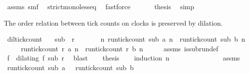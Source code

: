 \begin{isabellebody}
\ assms{\isacharparenleft}{}{\isacharparenright}\ smf\ \isamarkupfalse%
\ strict{\isacharunderscore}mono{\isacharunderscore}less{\isacharunderscore}eq\ \isamarkupfalse%
\ fastforce\isanewline
\ \ \isamarkupfalse%
\ {\isacharasterisk}{\isacharasterisk}\ \isamarkupfalse%
\ {\isacharquery}thesis\ \isamarkupfalse%
\ simp\isanewline
{}\isamarkupfalse%
%
\endisatagproof
{\isafoldproof}%
%
\isadelimproof
%
\endisadelimproof
%
\begin{isamarkuptext}%
The order relation between tick counts on clocks is preserved by dilation.%
\end{isamarkuptext}\isamarkuptrue%
\isamarkupfalse%
\ dil{\isacharunderscore}tick{\isacharunderscore}count{\isacharcolon}\isanewline
\ \ \ {\isacartoucheopen}sub\ {\isasymlless}\ r{\isacartoucheclose}\isanewline
\ \ \ \ \ \ \ {\isacartoucheopen}{\isasymforall}n{\isachardot}\ run{\isacharunderscore}tick{\isacharunderscore}count\ sub\ a\ n\ {\isasymle}\ run{\isacharunderscore}tick{\isacharunderscore}count\ sub\ b\ n{\isacartoucheclose}\isanewline
\ \ \ \ \ {\isacartoucheopen}run{\isacharunderscore}tick{\isacharunderscore}count\ r\ a\ n\ {\isasymle}\ run{\isacharunderscore}tick{\isacharunderscore}count\ r\ b\ n{\isacartoucheclose}\isanewline
%
\isadelimproof
%
\endisadelimproof
%
\isatagproof
{}\isamarkupfalse%
\ {\isacharminus}\isanewline
\ \ \isamarkupfalse%
\ assms{\isacharparenleft}{}{\isacharparenright}\ is{\isacharunderscore}subrun{\isacharunderscore}def\ \isamarkupfalse%
\ f\ \ {\isacharasterisk}{\isacharcolon}{\isacartoucheopen}dilating\ f\ sub\ r{\isacartoucheclose}\ \isamarkupfalse%
\ blast\isanewline
\ \ \isamarkupfalse%
\ {\isacharquery}thesis\isanewline
\ \ \isamarkupfalse%
\ {\isacharparenleft}induction\ n{\isacharparenright}\isanewline
\ \ \ \ \isamarkupfalse%
\ {}\ \isanewline
\ \ \ \ \ \ \isamarkupfalse%
\ assms{\isacharparenleft}{}{\isacharparenright}\ \isamarkupfalse%
\ {\isacartoucheopen}run{\isacharunderscore}tick{\isacharunderscore}count\ sub\ a\ {}\ {\isasymle}\ run{\isacharunderscore}tick{\isacharunderscore}count\ sub\ b\ {}{\isacartoucheclose}\ \isacommand{{\isachardot}{\isachardot}}\isamarkupfalse%
\isanewline
\ \ \ \ \ \ \isamarkupfalse%

\end{isabellebody}
